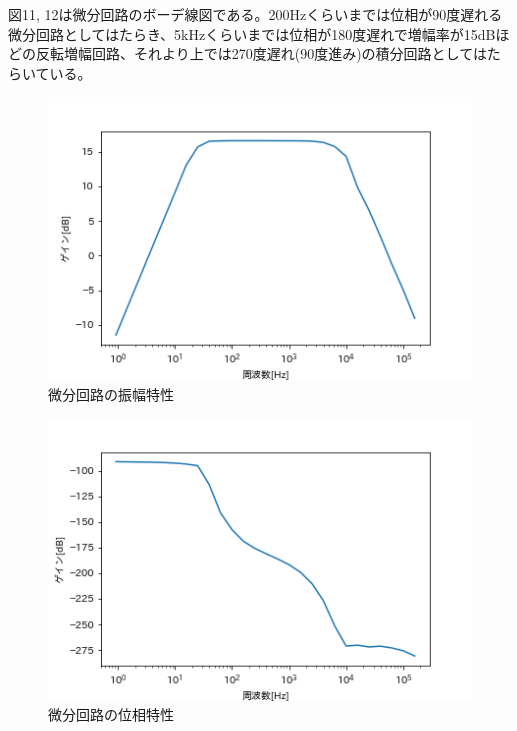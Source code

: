 \documentclass[dvipdfmx, twocolumn]{jsarticle}
\begin{document}
\begin{enumerate}
\begin{itemize}
図11, 12は微分回路のボーデ線図である。200Hzくらいまでは位相が90度遅れる微分回路としてはたらき、5kHzくらいまでは位相が180度遅れで増幅率が15dBほどの反転増幅回路、それより上では270度遅れ(90度進み)の積分回路としてはたらいている。
\begin{figure}[H]
\begin{center}
\includegraphics[scale = 0.5]{dGRrCf.png}
\caption{微分回路の振幅特性}
\end{center}
\end{figure}

\begin{figure}[H]
\begin{center}
\includegraphics[scale = 0.5]{dPRrCf.png}
\caption{微分回路の位相特性}
\end{center}
\end{figure}



\end{itemize}
\end{enumerate}
\end{document}
